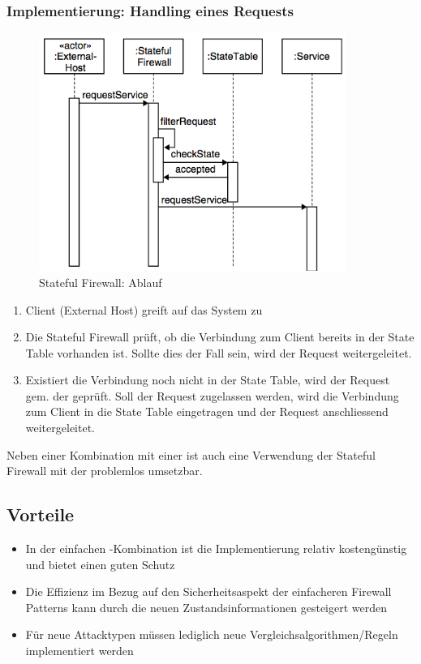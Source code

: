 \subsubsection*{Implementierung: Handling eines Requests}
\begin{figure}[H]
	\includegraphics[width=10cm]{content/firewall-architectures/images/stateful-sequence.png}
	\caption{Stateful Firewall: Ablauf \cite{SecPatterns06}}
\end{figure}

\begin{enumerate}
	\item Client (External Host) greift auf das System zu
	\item Die Stateful Firewall prüft, ob die Verbindung zum Client bereits in der State Table vorhanden ist. Sollte dies der Fall sein, wird der Request weitergeleitet.
	\item Existiert die Verbindung noch nicht in der State Table, wird der Request gem. der  geprüft. Soll der Request zugelassen werden, wird die Verbindung zum Client in die State Table eingetragen und der Request anschliessend weitergeleitet.
\end{enumerate}

Neben einer Kombination mit einer  ist auch eine Verwendung der Stateful Firewall mit der  problemlos umsetzbar.

\subsection*{Vorteile}
\begin{itemize}
	\item In der einfachen -Kombination ist die Implementierung relativ kostengünstig und bietet einen guten Schutz
	\item Die Effizienz im Bezug auf den Sicherheitsaspekt der einfacheren Firewall Patterns kann durch die neuen Zustandsinformationen gesteigert werden
	\item Für neue Attacktypen müssen lediglich neue Vergleichsalgorithmen/Regeln implementiert werden
\end{itemize}

